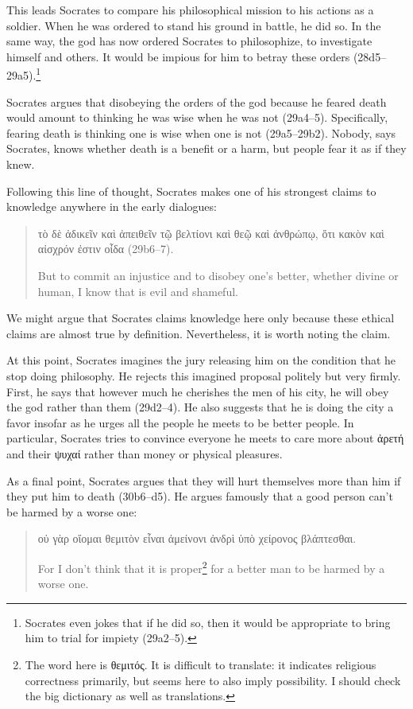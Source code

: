 \documentclass[11pt]{article}
\begin{document}
This leads Socrates to compare his philosophical mission to his actions as a soldier.  When he was ordered to stand his ground in battle, he did so.  In the same way, the god has now ordered Socrates to philosophize, to investigate himself and others.  It would be impious for him to betray these orders (28d5--29a5).\footnote{Socrates even jokes that if he did so, then it would be appropriate to bring him to trial for impiety (29a2--5).}

Socrates argues that disobeying the orders of the god because he feared death would amount to thinking he was wise when he was not (29a4--5).  Specifically, fearing death is thinking one is wise when one is not (29a5--29b2).  Nobody, says Socrates, knows whether death is a benefit or a harm, but people fear it as if they knew.

Following this line of thought, Socrates makes one of his strongest claims to knowledge anywhere in the early dialogues:

\begin{quote}
    τὸ δὲ ἀδικεῖν καὶ ἀπειθεῖν τῷ βελτίονι καὶ θεῷ καὶ ἀνθρώπῳ, ὅτι κακὸν καὶ αἰσχρόν ἐστιν οἶδα (29b6--7).

    But to commit an injustice and to disobey one's better, whether divine or human, I know that is evil and shameful.
\end{quote}

We might argue that Socrates claims knowledge here only because these ethical claims are almost true by definition.  Nevertheless, it is worth noting the claim.

At this point, Socrates imagines the jury releasing him on the condition that he stop doing philosophy.  He rejects this imagined proposal politely but very firmly.  First, he says that however much he cherishes the men of his city, he will obey the god rather than them (29d2--4).  He also suggests that he is doing the city a favor insofar as he urges all the people he meets to be better people.  In particular, Socrates tries to convince everyone he meets to care more about ἀρετή and their ψυχαί rather than money or physical pleasures.

As a final point, Socrates argues that they will hurt themselves more than him if they put him to death (30b6--d5).  He argues famously that a good person can't be harmed by a worse one:

\begin{quote}
    οὐ γὰρ οἴομαι θεμιτὸν εἶναι ἀμείνονι ἀνδρὶ ὑπὸ χείρονος βλάπτεσθαι.

    For I don't think that it is proper\footnote{The word here is θεμιτός.  It is difficult to translate: it indicates religious correctness primarily, but seems here to also imply possibility.  I should check the big dictionary as well as translations.} for a better man to be harmed by a worse one.
\end{quote}




\newpage


\end{document}
